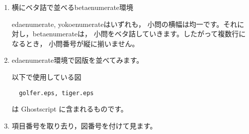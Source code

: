\documentclass[a4j]{jarticle}
\begin{document}
\begin{enumerate}
\item 横にベタ詰で並べる\textsf{betaenumerate}環境

  \textsf{edaenumerate}, \textsf{yokoenumerate}はいずれも，
  小問の横幅は均一です。それに対し，\textsf{betaenumerate}は，
  小問をベタ詰していきます。したがって複数行になるとき，
  小問番号が縦に揃いません。

\clearpage


\item \textsf{edaenumerate}環境で図版を並べてみます。

以下で使用している図
\begin{verbatim}
  golfer.eps, tiger.eps
\end{verbatim}
は Ghostscript に含まれるものです。


\makeatletter
\def\fgcaption{\def\@captype{figure}\caption}
\makeatother

\item 項目番号を取り去り，図番号を付けて見ます。\bigskip
\end{enumerate}
\end{document}
